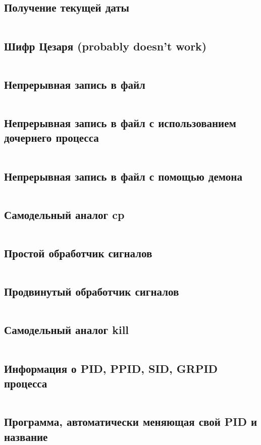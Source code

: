 \subsection{Получение текущей даты}
\inputminted{c}{src/timestamp.c}

\subsection{Шифр Цезаря (probably doesn't work)}
\inputminted{c}{src/encode.c}

\subsection{Непрерывная запись в файл}
\inputminted{c}{src/continous_write_to_file.c}

\subsection{Непрерывная запись в файл с использованием дочернего процесса}
\inputminted{c}{src/continous_write_to_file_with_fork.c}

\subsection{Непрерывная запись в файл с помощью демона}
\inputminted{c}{src/daemon.c}

\subsection{Самодельный аналог cp}
\inputminted{c}{src/copy.c}

\subsection{Простой обработчик сигналов}
\inputminted{c}{src/simple_signal_handler.c}

\subsection{Продвинутый обработчик сигналов}
\inputminted{c}{src/advanced_signal_handler.c}

\subsection{Самодельный аналог kill}
\inputminted{c}{src/kill.c}

\subsection{Информация о PID, PPID, SID, GRPID процесса}
\inputminted{c}{src/pid_sid_grp_info.c}

\subsection{Программа, автоматически меняющая свой PID и название}
\inputminted{c}{src/change_pid.c}
